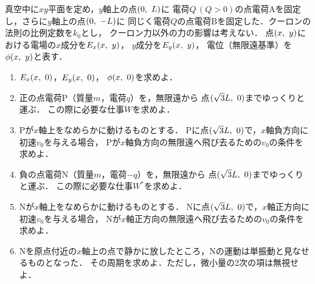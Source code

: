 \documentclass[../../../all/physics-standard_questions_all.tex]{subfiles}
\begin{document}
真空中に$xy$平面を定め，$y$軸上の点$(0, \hspace{1.2mm} L)$に
電荷$Q\,(Q>0)$の点電荷Aを固定し，さらに$y$軸上の点$(0, \hspace{1.2mm} -L)$に
同じく電荷$Q$の点電荷Bを固定した．クーロンの法則の比例定数を$k_0$とし，
クーロン力以外の力の影響は考えない．
点$(x, \hspace{1.2mm} y)$における電場の$x$成分を$E_x(x, \hspace{1.2mm} y)$，
$y$成分を$E_y(x, \hspace{1.2mm} y)$，
電位（無限遠基準）を$\phi(x, \hspace{1.2mm} y)$と表す．

\begin{enumerate}

    \item $E_x(x, \hspace{1.2mm} 0)$，$E_y(x, \hspace{1.2mm} 0)$，
    $\phi(x, \hspace{1.2mm} 0)$を求めよ．

    \item 正の点電荷P（質量$m$，電荷$q$）を，無限遠から
    点$(\sqrt{3}L, \hspace{1.2mm} 0)$までゆっくりと運ぶ．
    この際に必要な仕事$W$を求めよ．

    \item Pが$x$軸上をなめらかに動けるものとする．
    Pに点$(\sqrt{3}L, \hspace{1.2mm} 0)$で，$x$軸負方向に初速$v_0$を与える場合，
    Pが$x$軸負方向の無限遠へ飛び去るための$v_0$の条件を求めよ．

    \item 負の点電荷N（質量$m$，電荷$-q$）を，無限遠から
    点$(\sqrt{3}L, \hspace{1.2mm} 0)$までゆっくりと運ぶ．
    この際に必要な仕事$W^*$を求めよ．

    \item Nが$x$軸上をなめらかに動けるものとする．
    Nに点$(\sqrt{3}L, \hspace{1.2mm} 0)$で，$x$軸正方向に初速$v_0$を与える場合，
    Nが$x$軸正方向の無限遠へ飛び去るための$v_0$の条件を求めよ．

    \item Nを原点付近の$x$軸上の点で静かに放したところ，Nの運動は単振動と見なせるものとなった．
    その周期を求めよ．ただし，微小量の2次の項は無視せよ．

\end{enumerate}
\end{document}
